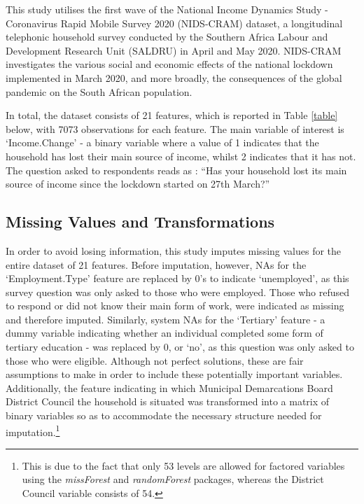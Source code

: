 \documentclass[11pt,preprint, authoryear]{elsarticle}
\numberwithin{equation}{section}
\numberwithin{figure}{section}
\numberwithin{table}{section}
\let\rmarkdownfootnote\footnote%
\def\footnote{\protect\rmarkdownfootnote}
\begin{document}
This study utilises the first wave of the National Income Dynamics Study
- Coronavirus Rapid Mobile Survey 2020 (NIDS-CRAM) dataset, a
longitudinal telephonic household survey conducted by the Southern
Africa Labour and Development Research Unit (SALDRU) in April and May
2020. NIDS-CRAM investigates the various social and economic effects of
the national lockdown implemented in March 2020, and more broadly, the
consequences of the global pandemic on the South African population.

In total, the dataset consists of 21 features, which is reported in
Table \ref{table} below, with 7073 observations for each feature. The
main variable of interest is `Income.Change' - a binary variable where a
value of 1 indicates that the household has lost their main source of
income, whilst 2 indicates that it has not. The question asked to
respondents reads as : ``Has your household lost its main source of
income since the lockdown started on 27th March?''

\hypertarget{missing-values-and-transformations}{%
\subsection*{Missing Values and
Transformations}\label{missing-values-and-transformations}}

In order to avoid losing information, this study imputes missing values
for the entire dataset of 21 features. Before imputation, however, NAs
for the `Employment.Type' feature are replaced by 0's to indicate
`unemployed', as this survey question was only asked to those who were
employed. Those who refused to respond or did not know their main form
of work, were indicated as missing and therefore imputed. Similarly,
system NAs for the `Tertiary' feature - a dummy variable indicating
whether an individual completed some form of tertiary education - was
replaced by 0, or `no', as this question was only asked to those who
were eligible. Although not perfect solutions, these are fair
assumptions to make in order to include these potentially important
variables. Additionally, the feature indicating in which Municipal
Demarcations Board District Council the household is situated was
transformed into a matrix of binary variables so as to accommodate the
necessary structure needed for imputation.\footnote{This is due to the
  fact that only 53 levels are allowed for factored variables using the
  \emph{missForest} and \emph{randomForest} packages, whereas the
  District Council variable consists of 54.}
\end{document}
